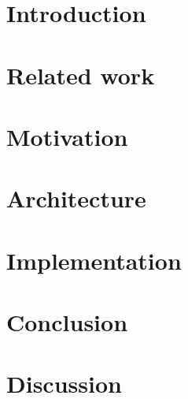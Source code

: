 \section{Introduction}

\section{Related work}

\section{Motivation}

\section{Architecture}

\section{Implementation}

\section{Conclusion}

\section{Discussion}

